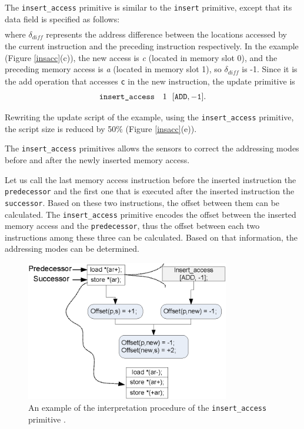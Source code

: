 The {\tt insert\_access} primitive is similar to the {\tt insert} primitive, except that its data field is specified as 
follows:
\begin{eqnarray}
[\textit{operation},\delta_{\textit{diff}}]\nonumber
\end{eqnarray}
where $\delta_{\textit{diff}}$ represents the address difference between the locations accessed by the current 
instruction and the preceding instruction respectively. In the example (Figure \ref{insacc}(c)), the new access is
 {\it c }(located in memory slot 0), and the preceding memory access is {\it a} (located in memory slot 1), so 
$\delta_{\textit{diff}}$ is -1.
Since it is the add operation that accesses {\tt c} in the new instruction, the update primitive is  
\begin{eqnarray}
 \texttt{insert\_access} ~~~1 ~~ [\tt{ADD}, -1].\nonumber
\end{eqnarray}

Rewriting the update script of the example, using the {\tt insert\_access} primitive, the script size is reduced by 
50\% (Figure \ref{insacc}(e)). 

The {\tt insert\_access} primitives allows the sensors to correct the
addressing modes before and after the newly inserted memory access.

Let us call the last memory access instruction before the inserted instruction the {\tt 
predecessor} and the first one that is executed after the inserted instruction the
{\tt successor}.
Based on these two instructions, the offset between them can be calculated.
The {\tt insert\_access} primitive encodes the offset between the inserted
memory access and the {\tt predecessor}, thus the offset between each two 
instructions among these three can be calculated.
Based on that information, the addressing modes can be determined.

\begin{figure}[htbp]
\centering
\includegraphics[width=3.5in]{./figures/insert_access.eps}
\caption{An example of the interpretation procedure of the {\tt insert\_access} primitive .}
\label{insertaccess}
\end{figure}


